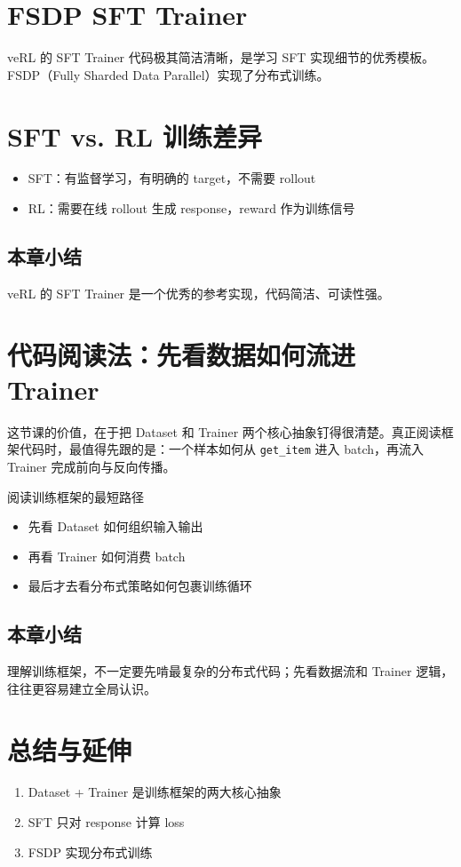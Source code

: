 \documentclass[a4paper]{article}
\begin{document}
\section{FSDP SFT Trainer}
veRL 的 SFT Trainer 代码极其简洁清晰，是学习 SFT 实现细节的优秀模板。FSDP（Fully Sharded Data Parallel）实现了分布式训练。

\section{SFT vs. RL 训练差异}
\begin{itemize}
  \item SFT：有监督学习，有明确的 target，不需要 rollout
  \item RL：需要在线 rollout 生成 response，reward 作为训练信号
\end{itemize}

\subsection{本章小结}
veRL 的 SFT Trainer 是一个优秀的参考实现，代码简洁、可读性强。

\newpage
\section{代码阅读法：先看数据如何流进 Trainer}
这节课的价值，在于把 Dataset 和 Trainer 两个核心抽象钉得很清楚。真正阅读框架代码时，最值得先跟的是：一个样本如何从 \texttt{get\_item} 进入 batch，再流入 Trainer 完成前向与反向传播。

\begin{knowledgebox}{阅读训练框架的最短路径}
\begin{itemize}
  \item 先看 Dataset 如何组织输入输出
  \item 再看 Trainer 如何消费 batch
  \item 最后才去看分布式策略如何包裹训练循环
\end{itemize}
\end{knowledgebox}

\subsection{本章小结}
理解训练框架，不一定要先啃最复杂的分布式代码；先看数据流和 Trainer 逻辑，往往更容易建立全局认识。

\newpage
\section{总结与延伸}
\begin{enumerate}
  \item Dataset + Trainer 是训练框架的两大核心抽象
  \item SFT 只对 response 计算 loss
  \item FSDP 实现分布式训练
\end{enumerate}
\end{document}
